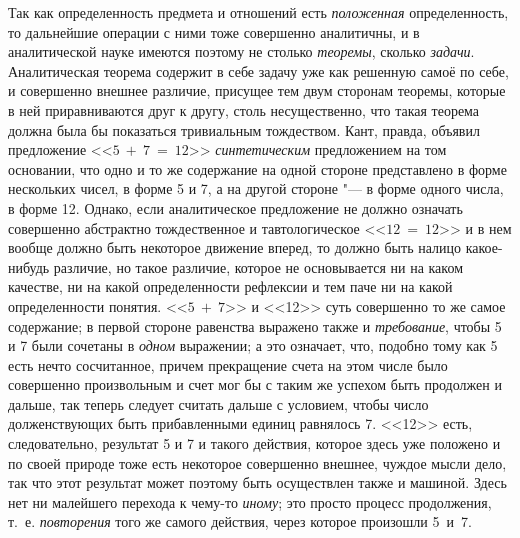 {{Так как определенность предмета и отношений есть
{\em положенная}
определенность, то дальнейшие операции с ними тоже совершенно
аналитичны, и в аналитической науке имеются поэтому не столько
{\em теоремы}, сколько
{\em задачи}.
Аналитическая теорема содержит в себе задачу уже как решенную
самоё по себе, и совершенно внешнее различие, присущее тем двум сторонам
теоремы, которые в ней приравниваются друг к другу, столь несущественно,
что такая теорема должна была бы показаться тривиальным тождеством. Кант,
правда, объявил предложение <<$5~+~7~=~12$>>
{\em синтетическим}
предложением на том основании, что одно и то же содержание на
одной стороне представлено в форме нескольких чисел, в форме 5 и 7, а на
другой стороне "--- в форме одного числа, в форме
12.
Однако, если аналитическое предложение не
должно означать совершенно абстрактно тождественное и тавтологическое
<<$12~=~12$>> и в нем вообще должно быть некоторое движение вперед, то должно
быть налицо какое-нибудь различие, но такое различие, которое не
основывается ни на каком качестве, ни на какой определенности рефлексии и
тем паче ни на какой определенности понятия. <<$5~+~7$>> и <<12>> суть совершенно
то же самое содержание; в первой стороне равенства выражено также и
{\em требование}, чтобы 5 и 7 были сочетаны в {\em одном}
выражении; а это означает, что, подобно тому как 5 есть нечто
сосчитанное, причем прекращение счета на этом числе было совершенно
произвольным и счет мог бы с таким же успехом быть продолжен и дальше, так
теперь следует считать дальше с условием, чтобы число долженствующих быть
прибавленными единиц равнялось 7. <<12>> есть, следовательно, результат 5 и 7
и такого действия, которое здесь уже положено и по своей природе тоже есть
некоторое совершенно внешнее, чуждое мысли дело, так что этот результат
может поэтому быть осуществлен также и машиной. Здесь нет ни малейшего
перехода к чему-то {\em иному};
это просто процесс продолжения, т.~е.
{\em повторения} того же
самого действия, через которое произошли 5~и~7.

}}
